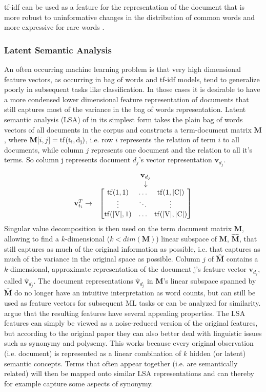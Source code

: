 tf-idf can be used as a feature for the representation of the document
that is more robust to uninformative changes in the distribution of
common words and more expressive for rare words \citep{Manning2008vect}.


\subsubsection*{Latent Semantic Analysis}

An often occurring machine learning problem is that very high dimensional
feature vectors, as occurring in bag of words and tf-idf models,
tend to generalize poorly in subsequent tasks like classification.
In those cases it is desirable to have a more condensed lower dimensional
feature representation of documents that still captures most of the
variance in the bag of words representation. Latent semantic analysis
(LSA) of \citet{Deerwester1990} in its simplest form takes the plain bag of words
vectors of all documents in the corpus and constructs a term-document
matrix $\textbf{M}$, where $\textbf{M}[i,j]=\rm{tf}(t_{i},d_{j})$, i.e. row $i$ represents
the relation of term $i$ to all documents, while column $j$ represents
one document and the relation to all it's terms. So column j represents document $d_j$'s vector representation $\textbf{v}_{d_j}$.
\[ 
\begin{matrix} & \textbf{v}_{d_j}\\
& \downarrow\\
\textbf{v}_{t_i}^{T}\rightarrow & \begin{bmatrix}\rm{tf}(1,1) & \dots & \rm{tf}(1,|C|)\\
\vdots & \ddots & \vdots\\
\rm{tf}(|V|,1) & \dots & \rm{tf}(|V|,|C|)
\end{bmatrix}
\end{matrix}
\]
Singular value decomposition is then used on the term document matrix
$\textbf{M}$, allowing to find a $k$-dimensional ($k<dim(\textbf{M})$) linear subspace
of $\textbf{M}$, $\hat{\textbf{M}}$, that still captures as much of the original information
as possible, i.e. that captures as much of the variance in the original
space as possible. Column $j$ of $\hat{\textbf{M}}$ contains a $k$-dimensional,
approximate representation of the document j's feature vector $\textbf{v}_{d_{j}}$, called $\hat{\textbf{v}}_{d_{j}}$.
The document representations $\hat{\textbf{v}}_{d_j}$ in $\textbf{M}$'s linear subspace
spanned by $\hat{\textbf{M}}$ do no longer have an intuitive interpretation
as word counts, but can still be used as feature vectors for subsequent
ML tasks or can be analyzed for similarity. \citet{Deerwester1990} argue
that the resulting features have several appealing properties. The
LSA features can simply be viewed as a noise-reduced version of the
original features, but according to the original paper they can also
better deal with linguistic issues such as synonymy and polysemy.
This works because every original observation (i.e. document) is represented
as a linear combination of $k$ hidden (or latent) semantic concepts.
Terms that often appear together (i.e. are semantically related) will
then be mapped onto similar LSA representations and can thereby for
example capture some aspects of synonymy.

